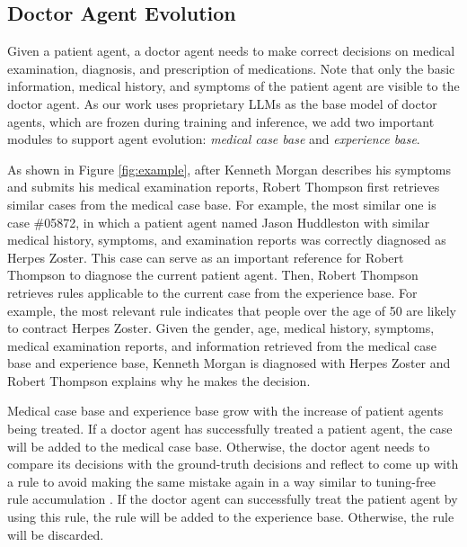 \documentclass[fleqn,12pt]{wlscirep}
\begin{document}
\subsection*{Doctor Agent Evolution}
Given a patient agent, a doctor agent needs to make correct decisions on medical examination, diagnosis, and prescription of medications. Note that only the basic information, medical history, and symptoms of the patient agent are visible to the doctor agent. As our work uses proprietary LLMs as the base model of doctor agents, which are frozen during training and inference, we add two important modules to support agent evolution: {\it medical case base} and {\it experience base}. 

As shown in Figure \ref{fig:example}, after Kenneth Morgan describes his symptoms and submits his medical examination reports, Robert Thompson first retrieves similar cases from the medical case base. For example, the most similar one is case \#05872, in which a patient agent named Jason Huddleston with similar medical history, symptoms, and examination reports was correctly diagnosed as Herpes Zoster. This case can serve as an important reference for Robert Thompson to diagnose the current patient agent. Then, Robert Thompson retrieves rules applicable to the current case from the experience base. For example, the most relevant rule indicates that people over the age of 50 are likely to contract Herpes Zoster. Given the gender, age, medical history, symptoms, medical examination reports, and information retrieved from the medical case base and experience base, Kenneth Morgan is diagnosed with Herpes Zoster and Robert Thompson explains why he makes the decision.

Medical case base and experience base grow with the increase of patient agents being treated. If a doctor agent has successfully treated a patient agent, the case will be added to the medical case base. Otherwise, the doctor agent needs to compare its decisions with the ground-truth decisions and reflect to come up with a rule to avoid making the same mistake again in a way similar to tuning-free rule accumulation \cite{Yang:23:Rule_Accumulation}. If the doctor agent can successfully treat the patient agent by using this rule, the rule will be added to the experience base. Otherwise, the rule will be discarded. 
\end{document}

